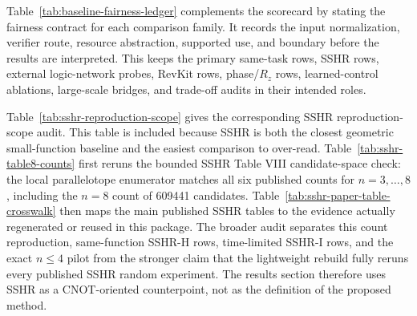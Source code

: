 \documentclass[11pt]{article}
\newcommand{\rz}{\ensuremath{R_z}}
\begin{document}
Table~\ref{tab:baseline-fairness-ledger} complements the scorecard by stating
the fairness contract for each comparison family.  It records the input
normalization, verifier route, resource abstraction, supported use, and
boundary before the results are interpreted.  This keeps the primary
same-task rows, SSHR rows, external logic-network probes, RevKit rows,
phase/\rz{} rows, learned-control ablations, large-scale bridges, and
trade-off audits in their intended roles.

\begin{table}[H]
\centering
\tiny
\setlength{\tabcolsep}{2pt}
\renewcommand{\arraystretch}{0.94}
\caption{Baseline fairness ledger.  Each comparison family is tied to an
input/verifier contract, evidence coverage, allowed manuscript use, and the
claim boundary that prevents cross-level or hardware-mapping over-reading.}
\label{tab:baseline-fairness-ledger}

\end{table}

Table~\ref{tab:sshr-reproduction-scope} gives the corresponding SSHR
reproduction-scope audit.  This table is included because SSHR is both the
closest geometric small-function baseline and the easiest comparison to
over-read.  Table~\ref{tab:sshr-table8-counts} first reruns the bounded SSHR
Table VIII candidate-space check: the local parallelotope enumerator matches
all six published counts for $n=3,\ldots,8$, including the $n=8$ count of
609441 candidates.  Table~\ref{tab:sshr-paper-table-crosswalk} then maps the
main published SSHR tables to the evidence actually regenerated or reused in
this package.  The broader audit separates this count reproduction,
same-function SSHR-H rows, time-limited SSHR-I rows, and the exact $n\leq4$
pilot from the stronger claim that the lightweight rebuild fully reruns every
published SSHR random experiment.  The results section therefore uses SSHR as
a CNOT-oriented counterpoint, not as the definition of the proposed method.

\begin{table}[H]
\centering
\scriptsize
\setlength{\tabcolsep}{5pt}
\renewcommand{\arraystretch}{1.05}
\caption{SSHR Table VIII candidate-space count reproduction.}
\label{tab:sshr-table8-counts}

\end{table}

\begin{table}[H]
\centering
\tiny
\setlength{\tabcolsep}{2pt}
\renewcommand{\arraystretch}{1.02}
\caption{Crosswalk from published SSHR tables to current package evidence.}
\label{tab:sshr-paper-table-crosswalk}

\end{table}
\end{document}
